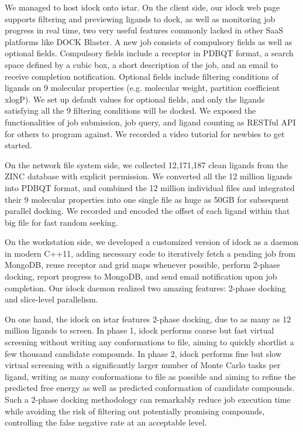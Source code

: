 \documentclass{bioinfo}
\begin{document}
We managed to host idock onto istar. On the client side, our idock web page supports filtering and previewing ligands to dock, as well as monitoring job progress in real time, two very useful features commonly lacked in other SaaS platforms like DOCK Blaster. A new job consists of compulsory fields as well as optional fields. Compulsory fields include a receptor in PDBQT format, a search space defined by a cubic box, a short description of the job, and an email to receive completion notification. Optional fields include filtering conditions of ligands on 9 molecular properties (e.g. molecular weight, partition coefficient xlogP). We set up default values for optional fields, and only the ligands satisfying all the 9 filtering conditions will be docked. We exposed the functionalities of job submission, job query, and ligand counting as RESTful API for others to program against. We recorded a video tutorial for newbies to get started.

On the network file system side, we collected 12,171,187 clean ligands from the ZINC database \citep{532,1178} with explicit permission. We converted all the 12 million ligands into PDBQT format, and combined the 12 million individual files and integrated their 9 molecular properties into one single file as huge as 50GB for subsequent parallel docking. We recorded and encoded the offset of each ligand within that big file for fast random seeking.

On the workstation side, we developed a customized version of idock as a daemon in modern C++11, adding necessary code to iteratively fetch a pending job from MongoDB, reuse receptor and grid maps whenever possible, perform 2-phase docking, report progress to MongoDB, and send email notification upon job completion. Our idock daemon realized two amazing features: 2-phase docking and slice-level parallelism.

On one hand, the idock on istar features 2-phase docking, due to as many as 12 million ligands to screen. In phase 1, idock performs coarse but fast virtual screening without writing any conformations to file, aiming to quickly shortlist a few thousand candidate compounds. In phase 2, idock performs fine but slow virtual screening with a significantly larger number of Monte Carlo tasks per ligand, writing as many conformations to file as possible and aiming to refine the predicted free energy as well as predicted conformation of candidate compounds. Such a 2-phase docking methodology can remarkably reduce job execution time while avoiding the risk of filtering out potentially promising compounds, controlling the false negative rate at an acceptable level.
\end{document}
